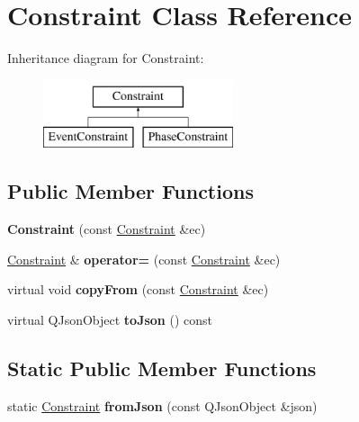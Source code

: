 \hypertarget{class_constraint}{\section{Constraint Class Reference}
\label{class_constraint}
}
Inheritance diagram for Constraint\-:\begin{figure}[H]
\begin{center}
\leavevmode
\includegraphics[height=2.000000cm]{class_constraint}
\end{center}
\end{figure}
\subsection*{Public Member Functions}
\begin{DoxyCompactItemize}
\item 
\hypertarget{class_constraint_a809eee40f7b80671e77a1549ebc23836}{{\bfseries Constraint} (const \hyperlink{class_constraint}{Constraint} \&ec)}\label{class_constraint_a809eee40f7b80671e77a1549ebc23836}

\item 
\hypertarget{class_constraint_ac301f3f00821bb8d1b118fa91a9ca305}{\hyperlink{class_constraint}{Constraint} \& {\bfseries operator=} (const \hyperlink{class_constraint}{Constraint} \&ec)}\label{class_constraint_ac301f3f00821bb8d1b118fa91a9ca305}

\item 
\hypertarget{class_constraint_a04f28bb86f1eed46adaba5a8aa1412f0}{virtual void {\bfseries copy\-From} (const \hyperlink{class_constraint}{Constraint} \&ec)}\label{class_constraint_a04f28bb86f1eed46adaba5a8aa1412f0}

\item 
\hypertarget{class_constraint_a72a96f7adb978ffd4955186d0d9b1ae7}{virtual Q\-Json\-Object {\bfseries to\-Json} () const }\label{class_constraint_a72a96f7adb978ffd4955186d0d9b1ae7}

\end{DoxyCompactItemize}
\subsection*{Static Public Member Functions}
\begin{DoxyCompactItemize}
\item 
\hypertarget{class_constraint_ae3c2e0bd10ed3febbf2275f05e002ea8}{static \hyperlink{class_constraint}{Constraint} {\bfseries from\-Json} (const Q\-Json\-Object \&json)}\label{class_constraint_ae3c2e0bd10ed3febbf2275f05e002ea8}

\end{DoxyCompactItemize}
